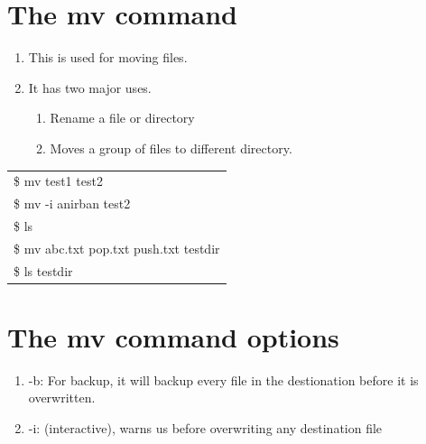 \documentclass[12pt, a4paper]{report}
\begin{document}
\section{The mv command}
\begin{enumerate}
\item This is used for moving files.
\item It has two major uses.
\begin{enumerate}
\item Rename a file or directory
\item Moves a group of files to  different directory.
\end{enumerate}
\end{enumerate}
\begin{tabular}{|l|}\hline
\$ mv test1 test2\\
\$ mv -i anirban test2\\
\$ ls\\
\$ mv abc.txt pop.txt push.txt testdir\\
\$ ls testdir\\ \hline
\end{tabular}
\section{The mv command options}
\begin{enumerate}
\item -b: For backup, it will backup every file in the destionation before it is overwritten.
\item -i: (interactive), warns us before overwriting any destination file
\end{enumerate}
\end{document}
